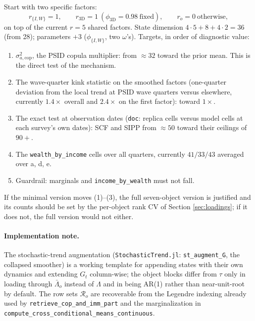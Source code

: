 \documentclass[11pt]{article}
\newcommand{\cop}{\mathrm{cop}}
\newcommand{\code}[1]{\texttt{#1}}
\begin{document}
Start with two specific factors:
\begin{equation}
  r_{\{I,W\}} = 1,\qquad r_{\mathrm{3D}} = 1\ (\phi_{\mathrm{3D}} = 0.98\ \text{fixed}),\qquad
  r_o = 0 \ \text{otherwise},
\end{equation}
on top of the current $r = 5$ shared factors. State dimension $4\cdot 5 + 8 + 4\cdot 2 = 36$
(from 28); parameters $+3$ ($\phi_{\{I,W\}}$, two $\omega$'s). Targets, in
order of diagnostic value:
\begin{enumerate}[leftmargin=*]
  \item $\sigma^2_{a,\cop}$, the PSID copula multiplier: from $\approx 32$
        toward the prior mean. This is the direct test of the mechanism.
  \item The wave-quarter kink statistic on the smoothed factors
        (one-quarter deviation from the local trend at PSID wave quarters
        versus elsewhere, currently $1.4\times$ overall and $2.4\times$ on the
        first factor): toward $1\times$.
  \item The exact test at observation dates
        (\code{doc}: replica cells versus model cells at each survey's own
        dates): SCF and SIPP from $\approx 50$ toward their ceilings of $90+$.
  \item The \code{wealth\_by\_income} cells over all quarters, currently
        $41/33/43$ averaged over a, d, e.
  \item Guardrail: marginals and \code{income\_by\_wealth} must not fall.
\end{enumerate}
If the minimal version moves (1)--(3), the full seven-object version is
justified and its counts should be set by the per-object rank CV of Section
\ref{sec:loadings}; if it does not, the full version would not either.

\paragraph{Implementation note.} The stochastic-trend augmentation
(\code{StochasticTrend.jl}: \code{st\_augment\_G}, the collapsed smoother) is a
working template for appending states with their own dynamics and extending
$G_t$ column-wise; the object blocks differ from $\tau$ only in loading through
$\bar\Lambda_o$ instead of $\Lambda$ and in being AR(1) rather than
near-unit-root by default. The row sets $\mathcal{R}_o$ are recoverable from
the Legendre indexing already used by \code{retrieve\_cop\_and\_imm\_part} and
the marginalization in \code{compute\_cross\_conditional\_means\_continuous}.
\end{document}
